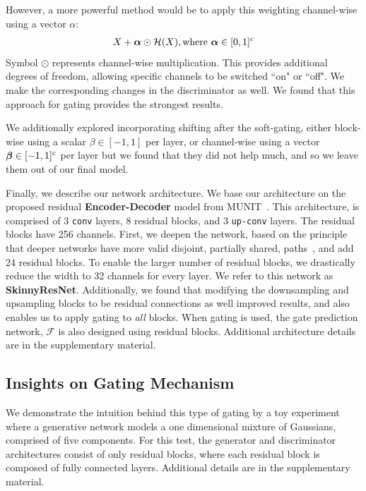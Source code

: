 However, a more powerful method would be to apply this weighting channel-wise using a vector {\boldmath$\alpha$}: %
\begin{align}
X + \mbox{\boldmath $\alpha$} \odot \mathcal{H}(X), \text{where } \mbox{\boldmath $\alpha$} \in [0,1]^c 
\end{align}
Symbol $\odot$ represents channel-wise multiplication. This provides additional degrees of freedom, allowing specific channels to be switched ``on" or ``off". 
We make the corresponding changes in the discriminator as well. 
We found that this approach for gating provides the strongest results. 

We additionally explored incorporating shifting after the soft-gating, either block-wise using a scalar $\beta \in [-1,1]$ per layer, or channel-wise using a vector $\mbox{\boldmath $\beta$} \in [-1, 1]^c$ per layer but we found that they did not help much, and so we leave them out of our final model.

Finally, we describe our network architecture. 
We base our architecture on the proposed residual \textbf{Encoder-Decoder} model from MUNIT~\cite{huang2018multimodal}.
This architecture, is comprised of 3 \texttt{conv} layers, 8 residual blocks, and 3 \texttt{up-conv} layers. The residual blocks have 256 channels. 
First, we deepen the network, based on the principle that deeper networks have more valid disjoint, partially shared, paths~\cite{veit2016residual}, and add 24 residual blocks. 
To enable the larger number of residual blocks, we drastically reduce the width to 32 channels for every layer. 
We refer to this network as \textbf{SkinnyResNet}. 
Additionally, we found that modifying the downsampling and upsampling blocks to be residual connections as well improved results, and also enables us to apply gating to {\em all} blocks. 
When gating is used, the gate prediction network, $\mathcal{F}$ 
is also designed using residual blocks. Additional architecture details are in the supplementary material. 



\subsection{Insights on Gating Mechanism}
We demonstrate the intuition behind this type of gating by a toy experiment  where a generative network models a one dimensional mixture of Gaussians, comprised of five components. 
For this test, the generator and discriminator architectures consist of only residual blocks, where each residual block is composed of fully connected layers. 
Additional details are in the supplementary material. 

